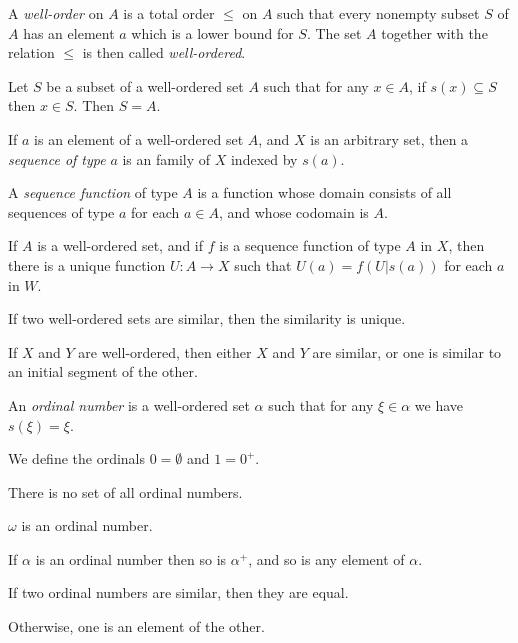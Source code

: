 \begin{defn}
  A \emph{well-order} on $A$ is a total order $\le$ on $A$ such that every
  nonempty subset $S$ of $A$ has an element $a$ which is a lower bound for $S$.
  The set $A$ together with the relation $\le$ is then called \emph{well-ordered}.
\end{defn}
\begin{thm}
  Let $S$ be a subset of a well-ordered set $A$ such that for any $x\in A$, if
  $s(x)\subseteq S$ then $x\in S$.
  Then $S=A$.
\end{thm}
\begin{defn}
  If $a$ is an element of a well-ordered set $A$, and $X$ is an arbitrary set,
  then a \emph{sequence of type} $a$ is an family of $X$ indexed by $s(a)$.

  A \emph{sequence function} of type $A$ is a function whose domain consists of
  all sequences of type $a$ for each $a\in A$, and whose codomain is $A$.
\end{defn}
\begin{prop}
  If $A$ is a well-ordered set, and if $f$ is a sequence function of type $A$ in
  $X$, then there is a unique function $U:A\to X$ such that $U(a)=f(U|s(a))$ for
  each $a$ in $W$.
\end{prop}
\begin{prop}
  If two well-ordered sets are similar, then the similarity is unique.
\end{prop}
\begin{thm}
  If $X$ and $Y$ are well-ordered, then either $X$ and $Y$ are similar, or one
  is similar to an initial segment of the other.
\end{thm}
\begin{defn}
  An \emph{ordinal number} is a well-ordered set $\alpha$ such that for any
  $\xi\in\alpha$ we have $s(\xi)=\xi$.

  We define the ordinals $0=\emptyset$ and $1=0^+$.
\end{defn}
\begin{prop}
  There is no set of all ordinal numbers.
\end{prop}
\begin{prop}
  $\omega$ is an ordinal number.
\end{prop}
\begin{prop}
  If $\alpha$ is an ordinal number then so is $\alpha^+$, and so is any element
  of $\alpha$.
\end{prop}
\begin{thm}
  If two ordinal numbers are similar, then they are equal.

  Otherwise, one is an element of the other.
\end{thm}
